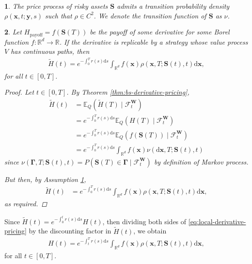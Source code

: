 \documentclass[english]{article}
\newcommand{\comment}[1]{\color{blue}#1\color{black}}
\numberwithin{equation}{section}
\numberwithin{figure}{section}
\theoremstyle{bolddescit}
\newtheorem{theorem}{\protect\theoremname}[section]
\theoremstyle{definition}
\theoremstyle{definition}
\theoremstyle{plain}
\theoremstyle{plain}
\theoremstyle{bolddesc}
\newtheorem{assumption}[theorem]{\protect\assumptionname}
\theoremstyle{plain}
\theoremstyle{remark}
\providecommand{\assumptionname}{Assumption}
\providecommand{\theoremname}{Theorem}
\begin{document}
\begin{assumption}\label{ass:local-density}
  The price process of risky assets $\mathbf{S}$ admits a transition probability density $\rho(\mathbf{x},t;\mathbf{y},s)$ such that $\rho \in C^2$. We denote the transition function of $\mathbf{S}$ as $\nu$.
\end{assumption}

\begin{theorem}\label{thm:local-derivative-pricing}
  Let $H_\text{payoff} = f(\mathbf{S}(T))$ be the payoff of some derivative for some Borel function $f : \mathbb{R}^d \to \mathbb{R}$.
  If the derivative is replicable by a strategy whose value process $V$ has continuous paths, then
  \begin{align}\label{eq:local-derivative-pricing}
    \widetilde{H}(t) = e^{-\int_0^T r(s) \mathrm{d}s} \int_{\mathbb{R}^d} f(\mathbf{x}) \rho(\mathbf{x},T;\mathbf{S}(t),t) \mathrm{d}\mathbf{x},
  \end{align}
  for all $t \in [0,T]$.

  \begin{proof}
    Let $t \in [0,T]$. By Theorem \ref{thm:bs-derivative-pricing},
    \begin{align*}
      \widetilde{H}(t)
      &= \mathbb{E}_Q(\widetilde{H}(T) \mid \mathcal{F}^\mathbf{W}_t)\\
      &= e^{-\int_0^T r(s) \mathrm{d}s} \mathbb{E}_Q(H(T) \mid \mathcal{F}^\mathbf{W}_t) \tag{$r$ is deterministic}\\
      &= e^{-\int_0^T r(s) \mathrm{d}s} \mathbb{E}_Q(f(\mathbf{S}(T)) \mid \mathcal{F}^\mathbf{W}_t)\\
      &= e^{-\int_0^T r(s) \mathrm{d}s} \int_{\mathbb{R}^d} f(\mathbf{x}) \nu(\mathrm{d}\mathbf{x},T;\mathbf{S}(t),t)
    \end{align*}
    since $\nu(\mathbf{\Gamma},T;\mathbf{S}(t),t) = P(\mathbf{S}(T) \in \mathbf{\Gamma} \mid \mathcal{F}^\mathbf{W}_t)$ by definition of Markov process.

    But then, by Assumption \ref{ass:local-density},
    \begin{align*}
      \widetilde{H}(t)
      &= e^{-\int_0^T r(s) \mathrm{d}s} \int_{\mathbb{R}^d} f(\mathbf{x}) \rho(\mathbf{x},T;\mathbf{S}(t),t) \mathrm{d}\mathbf{x},
    \end{align*}
    as required.
  \end{proof}
\end{theorem}

Since $\widetilde{H}(t) = e^{-\int_0^t r(s) \mathrm{d}s} H(t)$, then dividing both sides of \eqref{eq:local-derivative-pricing} by the discounting factor in $\widetilde{H}(t)$, we obtain
\begin{align*}
  H(t) = e^{-\int_t^T r(s) \mathrm{d}s} \int_{\mathbb{R}^d} f(\mathbf{x}) \rho(\mathbf{x},T;\mathbf{S}(t),t) \mathrm{d}\mathbf{x},
\end{align*}
for all $t \in [0,T]$.
\end{document}
